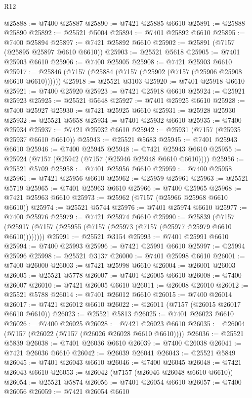 \begin{lexlean}{R12}
\begin{coremodule}
@25888 := @7400 @25887
@25890 := @7421 @25885 @6610
@25891 := @25888 @25890
@25892 := @25521 @5004
@25894 := @7401 @25892 @6610
@25895 := @7400 @25894
@25897 := @7421 @25892 @6610
@25902 := @25891 (@7157 (@25895 @25897 @6610 @6610))
@25903 := @25521 @5618
@25905 := @7401 @25903 @6610
@25906 := @7400 @25905
@25908 := @7421 @25903 @6610
@25917 := @25846 (@7157 (@25884 (@7157 (@25902 (@7157 (@25906 @25908 @6610 @6610))))))
@25918 := @25521 @3103
@25920 := @7401 @25918 @6610
@25921 := @7400 @25920
@25923 := @7421 @25918 @6610
@25924 := @25921 @25923
@25925 := @25521 @5648
@25927 := @7401 @25925 @6610
@25928 := @7400 @25927
@25930 := @7421 @25925 @6610
@25931 := @25928 @25930
@25932 := @25521 @5658
@25934 := @7401 @25932 @6610
@25935 := @7400 @25934
@25937 := @7421 @25932 @6610
@25942 := @25931 (@7157 (@25935 @25937 @6610 @6610))
@25943 := @25521 @5683
@25945 := @7401 @25943 @6610
@25946 := @7400 @25945
@25948 := @7421 @25943 @6610
@25955 := @25924 (@7157 (@25942 (@7157 (@25946 @25948 @6610 @6610))))
@25956 := @25521 @5709
@25958 := @7401 @25956 @6610
@25959 := @7400 @25958
@25961 := @7421 @25956 @6610
@25962 := @25959 @25961
@25963 := @25521 @5719
@25965 := @7401 @25963 @6610
@25966 := @7400 @25965
@25968 := @7421 @25963 @6610
@25973 := @25962 (@7157 (@25966 @25968 @6610 @6610))
@25974 := @25521 @5744
@25976 := @7401 @25974 @6610
@25977 := @7400 @25976
@25979 := @7421 @25974 @6610
@25990 := @25839
    (@7157 (@25917 (@7157 (@25955 (@7157 (@25973 (@7157 (@25977 @25979 @6610 @6610))))))))
@25991 := @25521 @3154
@25993 := @7401 @25991 @6610
@25994 := @7400 @25993
@25996 := @7421 @25991 @6610
@25997 := @25994 @25996
@25998 := @25521 @3137
@26000 := @7401 @25998 @6610
@26001 := @7400 @26000
@26003 := @7421 @25998 @6610
@26004 := @26001 @26003
@26005 := @25521 @5778
@26007 := @7401 @26005 @6610
@26008 := @7400 @26007
@26010 := @7421 @26005 @6610
@26011 := @26008 @26010
@26012 := @25521 @5788
@26014 := @7401 @26012 @6610
@26015 := @7400 @26014
@26017 := @7421 @26012 @6610
@26022 := @26011 (@7157 (@26015 @26017 @6610 @6610))
@26023 := @25521 @5813
@26025 := @7401 @26023 @6610
@26026 := @7400 @26025
@26028 := @7421 @26023 @6610
@26035 := @26004 (@7157 (@26022 (@7157 (@26026 @26028 @6610 @6610))))
@26036 := @25521 @5839
@26038 := @7401 @26036 @6610
@26039 := @7400 @26038
@26041 := @7421 @26036 @6610
@26042 := @26039 @26041
@26043 := @25521 @5849
@26045 := @7401 @26043 @6610
@26046 := @7400 @26045
@26048 := @7421 @26043 @6610
@26053 := @26042 (@7157 (@26046 @26048 @6610 @6610))
@26054 := @25521 @5874
@26056 := @7401 @26054 @6610
@26057 := @7400 @26056
@26059 := @7421 @26054 @6610

\end{coremodule}
\end{lexlean}
